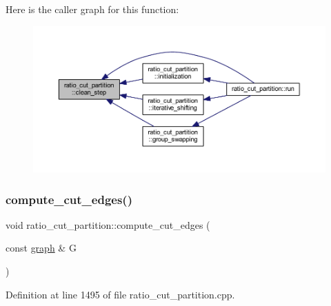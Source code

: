 Here is the caller graph for this function\+:\nopagebreak
\begin{figure}[H]
\begin{center}
\leavevmode
\includegraphics[width=350pt]{classratio__cut__partition_aa8e1c0cce3f126e1aa4a3aa8489986fa_icgraph}
\end{center}
\end{figure}
\mbox{\label{classratio__cut__partition_a5588508593940888323121b340b40477}} 
\subsubsection{\texorpdfstring{compute\+\_\+cut\+\_\+edges()}{compute\_cut\_edges()}}
{\footnotesize\ttfamily void ratio\+\_\+cut\+\_\+partition\+::compute\+\_\+cut\+\_\+edges (\begin{DoxyParamCaption}\item[{const \mbox{\hyperlink{classgraph}{graph}} \&}]{G }\end{DoxyParamCaption})\hspace{0.3cm}{\ttfamily [protected]}}



Definition at line 1495 of file ratio\+\_\+cut\+\_\+partition.\+cpp.


